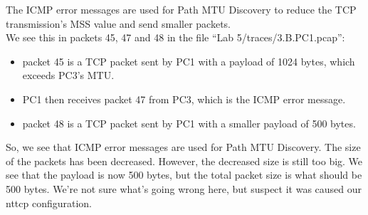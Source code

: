 The ICMP error messages are used for Path MTU Discovery to reduce the TCP transmission's MSS value and send smaller packets. \\

We see this in packets 45, 47 and 48 in the file ``Lab 5/traces/3.B.PC1.pcap'':
\begin{itemize}
    \item packet 45 is a TCP packet sent by PC1 with a payload of 1024 bytes, which exceeds PC3's MTU.
    \item PC1 then receives packet 47 from PC3, which is the ICMP error message.
    \item packet 48 is a TCP packet sent by PC1 with a smaller payload of 500 bytes.
\end{itemize}

So, we see that ICMP error messages are used for Path MTU Discovery. The size of the packets has been decreased.
However, the decreased size is still too big. We see that the payload is now 500 bytes, but the total packet size is what should be 500 bytes.
We're not sure what's going wrong here, but suspect it was caused our nttcp configuration.
